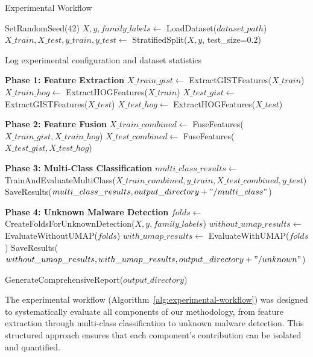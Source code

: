 \begin{algorithm}[!htbp]
\caption{Experimental Workflow}
\label{alg:experimental-workflow}
\begin{algorithmic}[1]
    \State SetRandomSeed(42) 
    \State $X, y, family\_labels \leftarrow$ LoadDataset($dataset\_path$)
    \State $X\_train, X\_test, y\_train, y\_test \leftarrow$ StratifiedSplit($X, y$, test\_size=0.2)
    
    \State Log experimental configuration and dataset statistics
    
    \State \textbf{Phase 1: Feature Extraction}
    \State $X\_train\_gist \leftarrow$ ExtractGISTFeatures($X\_train$)
    \State $X\_train\_hog \leftarrow$ ExtractHOGFeatures($X\_train$)
    \State $X\_test\_gist \leftarrow$ ExtractGISTFeatures($X\_test$)
    \State $X\_test\_hog \leftarrow$ ExtractHOGFeatures($X\_test$)
    
    \State \textbf{Phase 2: Feature Fusion}
    \State $X\_train\_combined \leftarrow$ FuseFeatures($X\_train\_gist, X\_train\_hog$)
    \State $X\_test\_combined \leftarrow$ FuseFeatures($X\_test\_gist, X\_test\_hog$)
    
    \State \textbf{Phase 3: Multi-Class Classification}
    \State $multi\_class\_results \leftarrow$ TrainAndEvaluateMultiClass($X\_train\_combined, y\_train, X\_test\_combined, y\_test$)
    \State SaveResults($multi\_class\_results, output\_directory + "/multi\_class"$)
    
    \State \textbf{Phase 4: Unknown Malware Detection}
    \State $folds \leftarrow$ CreateFoldsForUnknownDetection($X, y, family\_labels$)
    \State $without\_umap\_results \leftarrow$ EvaluateWithoutUMAP($folds$)
    \State $with\_umap\_results \leftarrow$ EvaluateWithUMAP($folds$)
    \State SaveResults($without\_umap\_results, with\_umap\_results, output\_directory + "/unknown"$)
    
    \State GenerateComprehensiveReport($output\_directory$)
\EndProcedure
\end{algorithmic}
\end{algorithm}

The experimental workflow (Algorithm~\ref{alg:experimental-workflow}) was designed to systematically evaluate all components of our methodology, from feature extraction through multi-class classification to unknown malware detection. This structured approach ensures that each component's contribution can be isolated and quantified.

